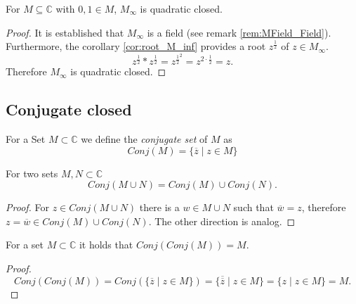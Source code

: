 \begin{lemma}
    \label{lem:M_inf_quad_closed}
    \leanok
    For $M\subseteq \mathbb{C}$ with $0,1 \in M$, $M_{\infty}$ is quadratic closed.
\end{lemma}
\begin{proof}
    \leanok
    It is established that $M_{\infty}$ is a field (see remark \ref{rem:MField_Field}). Furthermore, the corollary \ref{cor:root_M_inf} provides a root $z^{\frac{1}{2}}$ of $z \in M_{\infty}$.    
    $$ z^{\frac{1}{2}} * z^{\frac{1}{2}} = z^{\frac{1}{2}^2} = z^{2\cdot \frac{1}{2}} = z.$$
    Therefore $M_{\infty}$ is quadratic closed.
\end{proof}

\subsection*{Conjugate closed}
\begin{definition}
    \label{def:conj_set}
    \leanok
    For a Set $M \subset \mathbb{C}$ we define the \emph{conjugate set} of $M$ as 
    \begin{equation*}
        Conj(M) = \{\overline{z}\mid z\in M\}
    \end{equation*}
\end{definition}

\begin{lemma}
    \label{lem:conj_union}
    \leanok
    For two sets $M,N \subset \mathbb{C}$ $$Conj(M\cup N) = Conj(M) \cup Conj(N).$$
\end{lemma}
\begin{proof}
    \leanok
    For $z \in Conj(M\cup N)$ there is a $w \in M\cup N$ such that $\overline{w} = z$, therefore $ z = \overline{w} \in Conj(M) \cup Conj(N)$. The other direction is analog.
\end{proof}

\begin{lemma}
    \label{lem:conj_conj_id}
    \leanok
    For a set $M \subset \mathbb{C}$ it holds that $Conj(Conj(M)) = M$.
\end{lemma}
\begin{proof}
    \leanok
    $$Conj(Conj(M)) = Conj(\{\overline{z}\mid z\in M\}) = \{\overline{\overline{z}}\mid z\in M\} = \{ z \mid z\in M\} = M.$$
\end{proof}

